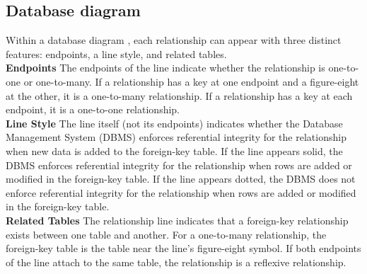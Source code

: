 \documentclass[12pt,a4paper]{article}
\newcommand\tab[1][.7cm]{\hspace*{#1}}
\begin{document}
\subsection{Database diagram}
	\justify\tab Within a database diagram \cite{Ref:12}, each relationship can appear with three distinct features: endpoints, a line style, and related tables.\\
\textbf{Endpoints} The endpoints of the line indicate whether the relationship is one-to-one or one-to-many. If a relationship has a key at one endpoint and a figure-eight at the other, it is a one-to-many relationship. If a relationship has a key at each endpoint, it is a one-to-one relationship.\\
\textbf{Line Style} The line itself (not its endpoints) indicates whether the Database Management System (DBMS) enforces referential integrity for the relationship when new data is added to the foreign-key table. If the line appears solid, the DBMS enforces referential integrity for the relationship when rows are added or modified in the foreign-key table. If the line appears dotted, the DBMS does not enforce referential integrity for the relationship when rows are added or modified in the foreign-key table.\\
\textbf{Related Tables} The relationship line indicates that a foreign-key relationship exists between one table and another. For a one-to-many relationship, the foreign-key table is the table near the line's figure-eight symbol. If both endpoints of the line attach to the same table, the relationship is a reflexive relationship.
\end{document}
